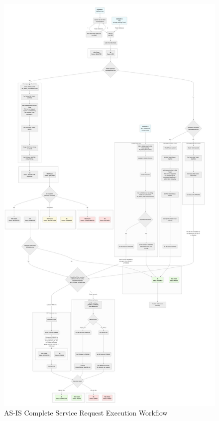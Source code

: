 \begin{figure}[htbp]
    \centering
    \includegraphics[width=\textwidth, height=\textheight, keepaspectratio]{images/as-is/Flowchart AS-IS.jpg}
    \caption{AS-IS Complete Service Request Execution Workflow}
    \label{fig:flowchart-as-is}
\end{figure}

